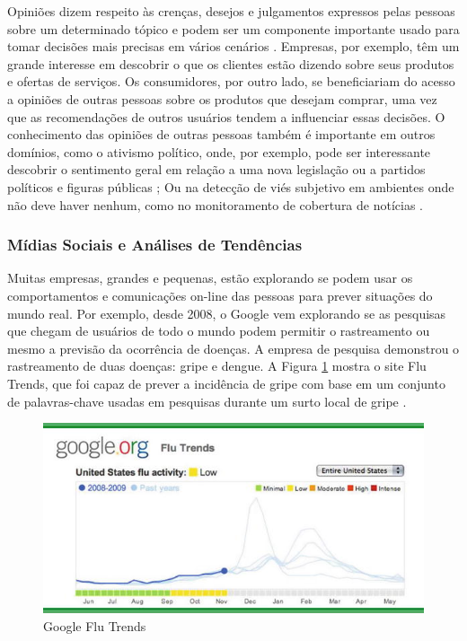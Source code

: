 \documentclass[
	12pt,				%
	openright,			%
	oneside,			%
	a4paper,			%
	english,			%
	spanish,			%
	brazil				%
	]{abntex2}
\begin{document}
	Opiniões dizem respeito às crenças, desejos e julgamentos expressos pelas pessoas sobre um determinado tópico e podem ser um componente importante usado para tomar decisões mais precisas em vários cenários \cite{book_discover_practices}. Empresas, por exemplo, têm um grande interesse em descobrir o que os clientes estão dizendo sobre seus produtos e ofertas de serviços. Os consumidores, por outro lado, se beneficiariam do acesso a opiniões de outras pessoas sobre os produtos que desejam comprar, uma vez que as recomendações de outros usuários tendem a influenciar essas decisões. O conhecimento das opiniões de outras pessoas também é importante em outros domínios, como o ativismo político, onde, por exemplo, pode ser interessante descobrir o sentimento geral em relação a uma nova legislação ou a partidos políticos e figuras públicas \cite{book_political_opinion}; Ou na detecção de viés subjetivo em ambientes onde não deve haver nenhum, como no monitoramento de cobertura de notícias \cite{book_Cambria2015}.

	\subsubsection*{Mídias Sociais e Análises de Tendências}
	Muitas empresas, grandes e pequenas, estão explorando se podem usar os comportamentos e comunicações on-line das pessoas para prever situações do mundo real. Por exemplo, desde 2008, o Google vem explorando se as pesquisas que chegam de usuários de todo o mundo podem permitir o rastreamento ou mesmo a previsão da ocorrência de doenças. A empresa de pesquisa demonstrou o rastreamento de duas doenças: gripe e dengue. A Figura \ref{google_flu} mostra o site Flu Trends, que foi capaz de prever a incidência de gripe com base em um conjunto de palavras-chave usadas em pesquisas durante um surto local de gripe \cite{book_social_machines}.

\begin{figure}[!h]
\centering
\includegraphics{google_flu}
\caption{Google Flu Trends}
\label{google_flu}
\end{figure}
\end{document}
